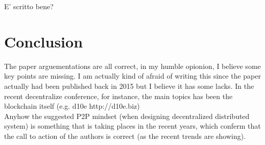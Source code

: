 \documentclass[paper=a4, fontsize=11pt]{scrartcl} %
\numberwithin{equation}{section} %
\numberwithin{figure}{section} %
\numberwithin{table}{section} %
\begin{document}
E' scritto bene?

\section{Conclusion}

The paper arguementations are all correct, in my humble opionion, I believe some key points are missing. 
I am actually kind of afraid of writing this since the paper actually had been published back in 2015 but I believe it has some lacks. In the recent decentralize conference, for instance, the main topics has been the blockchain itself (e.g. d10e http://d10e.biz) \\

Anyhow the suggested P2P mindset (when designing decentralized distributed system) is something that is taking places in the recent years, which conferm that the call to action of the authors is correct (as the recent trends are showing).
\end{document}
